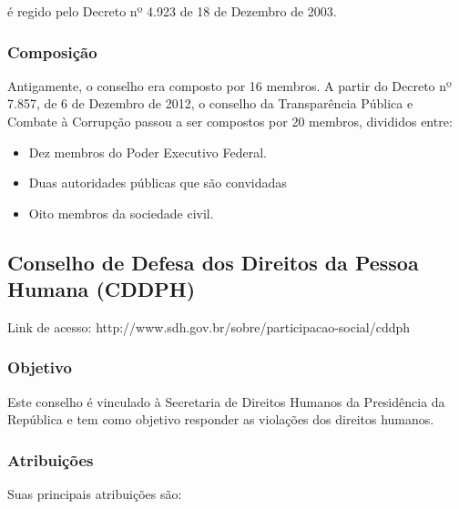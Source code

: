 é regido pelo Decreto nº 4.923 de 18 de Dezembro de
2003.

\subsubsection*{Composição}

Antigamente, o conselho era composto por 16 membros. A partir do Decreto
nº 7.857, de 6 de Dezembro de 2012, o conselho da
Transparência Pública e Combate à Corrupção passou a ser
compostos por 20 membros, divididos entre:

\begin{itemize}
\item Dez membros do Poder Executivo Federal.
\item Duas autoridades públicas que são convidadas
\item Oito membros da sociedade civil.
\end{itemize}
\newpage
\subsection*{Conselho de Defesa dos Direitos da Pessoa Humana (CDDPH)}

Link de acesso: http://www.sdh.gov.br/sobre/participacao-social/cddph 

\subsubsection*{Objetivo}

Este conselho é vinculado à Secretaria de Direitos Humanos da
Presidência da República e tem como objetivo responder as
violações dos direitos humanos.

\subsubsection*{Atribuições}

Suas principais atribuições são:


